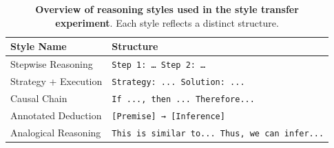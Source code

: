 \begin{table}[t]
\centering
\caption{\textbf{Overview of reasoning styles used in the style transfer experiment}. Each style reflects a distinct structure.}
\begin{tabularx}{\textwidth}{l X}
\toprule
\textbf{Style Name} & \textbf{Structure} \\
\midrule
Stepwise Reasoning & \texttt{Step 1: … Step 2: …} \\
Strategy + Execution & \texttt{Strategy: ... Solution: ...} \\
Causal Chain & \texttt{If ..., then ... Therefore...} \\
Annotated Deduction & \texttt{[Premise] → [Inference]} \\
Analogical Reasoning & \texttt{This is similar to... Thus, we can infer...} \\
\bottomrule
\end{tabularx}
\label{tab:reasoning_styles}
\end{table}